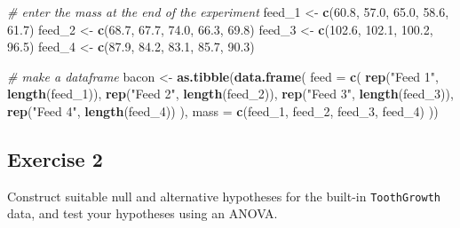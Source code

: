\documentclass[english,10pt,a4paper,oneside]{book}
\newenvironment{Shaded}{\begin{snugshade}}{\end{snugshade}}
\newcommand{\CommentTok}[1]{\textcolor[rgb]{0.56,0.35,0.01}{\textit{#1}}}
\newcommand{\DataTypeTok}[1]{\textcolor[rgb]{0.13,0.29,0.53}{#1}}
\newcommand{\DecValTok}[1]{\textcolor[rgb]{0.00,0.00,0.81}{#1}}
\newcommand{\FloatTok}[1]{\textcolor[rgb]{0.00,0.00,0.81}{#1}}
\newcommand{\KeywordTok}[1]{\textcolor[rgb]{0.13,0.29,0.53}{\textbf{#1}}}
\newcommand{\NormalTok}[1]{#1}
\newcommand{\StringTok}[1]{\textcolor[rgb]{0.31,0.60,0.02}{#1}}
\theoremstyle{definition}
\theoremstyle{definition}
\theoremstyle{definition}
\theoremstyle{remark}
\begin{document}
\begin{Shaded}
\begin{Highlighting}[]
\CommentTok{# enter the mass at the end of the experiment}
\NormalTok{feed_}\DecValTok{1}\NormalTok{ <-}\StringTok{ }\KeywordTok{c}\NormalTok{(}\FloatTok{60.8}\NormalTok{, }\FloatTok{57.0}\NormalTok{, }\FloatTok{65.0}\NormalTok{, }\FloatTok{58.6}\NormalTok{, }\FloatTok{61.7}\NormalTok{)}
\NormalTok{feed_}\DecValTok{2}\NormalTok{ <-}\StringTok{ }\KeywordTok{c}\NormalTok{(}\FloatTok{68.7}\NormalTok{, }\FloatTok{67.7}\NormalTok{, }\FloatTok{74.0}\NormalTok{, }\FloatTok{66.3}\NormalTok{, }\FloatTok{69.8}\NormalTok{)}
\NormalTok{feed_}\DecValTok{3}\NormalTok{ <-}\StringTok{ }\KeywordTok{c}\NormalTok{(}\FloatTok{102.6}\NormalTok{, }\FloatTok{102.1}\NormalTok{, }\FloatTok{100.2}\NormalTok{, }\FloatTok{96.5}\NormalTok{)}
\NormalTok{feed_}\DecValTok{4}\NormalTok{ <-}\StringTok{ }\KeywordTok{c}\NormalTok{(}\FloatTok{87.9}\NormalTok{, }\FloatTok{84.2}\NormalTok{, }\FloatTok{83.1}\NormalTok{, }\FloatTok{85.7}\NormalTok{, }\FloatTok{90.3}\NormalTok{)}

\CommentTok{# make a dataframe}
\NormalTok{bacon <-}\StringTok{ }\KeywordTok{as.tibble}\NormalTok{(}\KeywordTok{data.frame}\NormalTok{(}
  \DataTypeTok{feed =} \KeywordTok{c}\NormalTok{(}
  \KeywordTok{rep}\NormalTok{(}\StringTok{"Feed 1"}\NormalTok{, }\KeywordTok{length}\NormalTok{(feed_}\DecValTok{1}\NormalTok{)),}
  \KeywordTok{rep}\NormalTok{(}\StringTok{"Feed 2"}\NormalTok{, }\KeywordTok{length}\NormalTok{(feed_}\DecValTok{2}\NormalTok{)),}
  \KeywordTok{rep}\NormalTok{(}\StringTok{"Feed 3"}\NormalTok{, }\KeywordTok{length}\NormalTok{(feed_}\DecValTok{3}\NormalTok{)),}
  \KeywordTok{rep}\NormalTok{(}\StringTok{"Feed 4"}\NormalTok{, }\KeywordTok{length}\NormalTok{(feed_}\DecValTok{4}\NormalTok{))}
\NormalTok{  ),}
  \DataTypeTok{mass =} \KeywordTok{c}\NormalTok{(feed_}\DecValTok{1}\NormalTok{, feed_}\DecValTok{2}\NormalTok{, feed_}\DecValTok{3}\NormalTok{, feed_}\DecValTok{4}\NormalTok{)}
\NormalTok{  ))}
\end{Highlighting}
\end{Shaded}

\hypertarget{exercise-2-1}{%
\subsection{Exercise 2}\label{exercise-2-1}}

Construct suitable null and alternative hypotheses for the built-in
\texttt{ToothGrowth} data, and test your hypotheses using an ANOVA.
\end{document}

